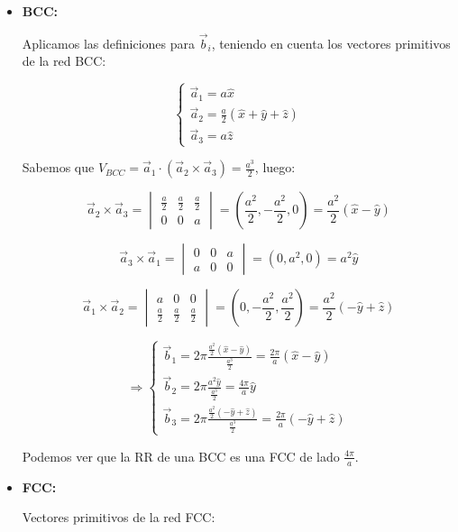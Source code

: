 \documentclass[a4paper]{article}
\begin{document}
\begin{itemize}
\item\textbf{BCC:}

Aplicamos las definiciones para $\vec{b}_{i}$, teniendo en cuenta los vectores primitivos de la red BCC:

$$\begin{cases}
\vec{a}_{1} = a\hat{x} \\
\vec{a}_{2} = \frac{a}{2}(\hat{x} + \hat{y} + \hat{z}) \\
\vec{a}_{3} = a\hat{z}
\end{cases}$$

Sabemos que $V_{BCC} = \vec{a}_{1} \cdot (\vec{a}_{2} \times \vec{a}_{3}) = \frac{a^{3}}{2}$, luego:

$$ \vec{a}_{2} \times \vec{a}_{3} = \begin{vmatrix}
\frac{a}{2} & \frac{a}{2} & \frac{a}{2} \\ 
0 & 0 & a
\end{vmatrix}  = (\frac{a^{2}}{2}, -\frac{a^{2}}{2}, 0) = \frac{a^{2}}{2}(\hat{x} - \hat{y})$$

$$ \vec{a}_{3} \times \vec{a}_{1} = \begin{vmatrix}
0 & 0 & a \\
a & 0 & 0
\end{vmatrix}  = (0, a^{2}, 0) = a^{2}\hat{y}$$

$$ \vec{a}_{1} \times \vec{a}_{2} = \begin{vmatrix}
a & 0 & 0 \\ 
\frac{a}{2} & \frac{a}{2} & \frac{a}{2}
\end{vmatrix}  = (0, -\frac{a^{2}}{2}, \frac{a^{2}}{2}) = \frac{a^{2}}{2}(-\hat{y} + \hat{z})$$

$$\Rightarrow \begin{cases}
\vec{b}_{1} = 2\pi \frac{\frac{a^{2}}{2}(\hat{x} - \hat{y})}{\frac{a^{3}}{2}} = \frac{2\pi}{a}(\hat{x} - \hat{y})\\
\vec{b}_{2} = 2\pi \frac{a^{2}\hat{y}}{\frac{a^{3}}{2}} = \frac{4\pi}{a}\hat{y}\\
\vec{b}_{3} = 2\pi \frac{\frac{a^{2}}{2}(-\hat{y} + \hat{z})}{\frac{a^{3}}{2}} = \frac{2\pi}{a}(-\hat{y} + \hat{z})
\end{cases}$$

Podemos ver que la RR de una BCC es una FCC de lado $\frac{4 \pi}{a}$.

\item\textbf{FCC:}

Vectores primitivos de la red FCC:


\end{itemize}
\end{document}
